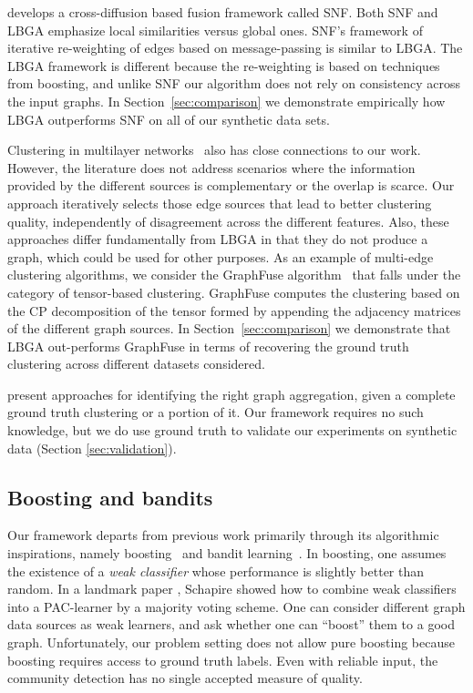 \documentclass{article}
\begin{document}
\cite{Wang14} develops a cross-diffusion based fusion framework called SNF.
Both SNF and LBGA emphasize local similarities versus global ones. SNF's
framework of iterative re-weighting of edges based on message-passing is
similar to LBGA. The LBGA framework is different because the re-weighting is
based on techniques from boosting, and unlike SNF our algorithm does not rely
on consistency across the input graphs. In Section~\ref{sec:comparison} we
demonstrate empirically how LBGA outperforms SNF on all of our synthetic data
sets.
 
Clustering in multilayer
networks~\cite{Papalexakis2013,Tang2009,Tang2012,Mucha2010,Berlingerio2011,kolda2009,Shiga12}
also has close connections to our work. However, the literature does not
address scenarios where the information provided by the different sources is
complementary or the overlap is scarce. Our approach iteratively selects those
edge sources that lead to better clustering quality, independently of
disagreement across the different features. Also, these approaches differ
fundamentally from LBGA in that they do not produce a graph, which could be
used for other purposes. As an example of multi-edge clustering algorithms, we
consider the GraphFuse algorithm~\cite{Papalexakis2013} that falls under the
category of tensor-based clustering. GraphFuse computes the clustering based on
the CP decomposition of the tensor formed by appending the adjacency matrices
of the different graph sources. In Section~\ref{sec:comparison} we demonstrate
that LBGA out-performs GraphFuse in terms of recovering the ground truth
clustering across different datasets considered.

\cite{Rocklin2013,Cai2005} present approaches for identifying the right graph
aggregation, given a complete ground truth clustering or a portion of it. Our
framework requires no such knowledge, but we do use ground truth to validate
our experiments on synthetic data (Section \ref{sec:validation}).

\subsection{Boosting and bandits}
Our framework departs from previous work primarily through its algorithmic
inspirations, namely boosting~\cite{Schapire90} and bandit
learning~\cite{Bubeck12}. In boosting, one assumes the existence of a {\em weak
classifier} whose performance is slightly better than random. In a landmark
paper \cite{Schapire90}, Schapire showed how to combine weak classifiers into a
PAC-learner by a majority voting scheme. One can consider different graph data
sources as weak learners, and ask whether one can ``boost'' them to a good
graph. Unfortunately, our problem setting does not allow pure boosting because
boosting requires access to ground truth labels. Even with reliable input, the
community detection has no single accepted measure of quality. 
\end{document}
